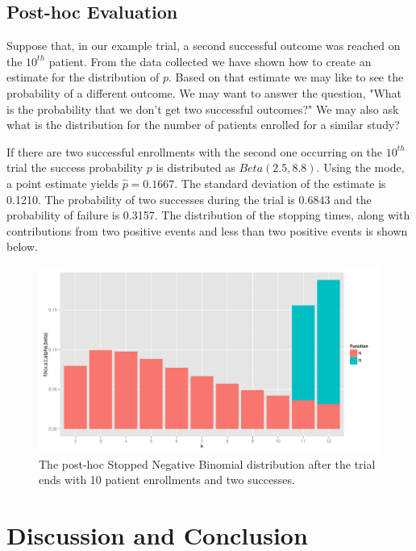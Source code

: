 \documentclass[12pt]{article}         %
\begin{document}
\subsection{Post-hoc Evaluation}

Suppose that, in our example trial, a second successful outcome was reached 
on the $10^{th}$ patient. From the data collected we have shown how to create 
an estimate for the distribution of $p$. Based on that estimate we may like to 
see the probability of a different outcome. We may want to answer the
question, "What is the probability that we don't get two successful outcomes?" 
We may also ask what is the distribution for the number of patients 
enrolled for a similar study?

If there are two successful enrollments with the second one occurring 
on the $10^{th}$ trial the success probability $p$ is distributed as 
$Beta(2.5, 8.8)$. 
Using the mode, a point estimate yields $\hat{p} = 0.1667$. The standard 
deviation of the estimate is 0.1210. The probability of two successes during 
the trial is 0.6843 and the probability of failure is 0.3157. The distribution 
of the stopping times, along with contributions from two positive events and 
less than two positive events is shown below.

\begin{figure}[ht]
\includegraphics[width=\textwidth]{post_hoc.pdf}
\caption{
The post-hoc Stopped Negative Binomial distribution after the trial ends with 10 patient enrollments and two successes.
}
\label{fig:post_hoc}
\end{figure}

\section{Discussion and Conclusion}
\end{document}
